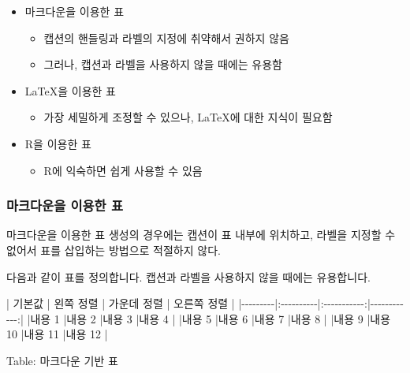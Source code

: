 \documentclass[
  letterpaper,
]{book}
\newenvironment{Shaded}{\begin{snugshade}}{\end{snugshade}}
\newcommand{\NormalTok}[1]{\textcolor[rgb]{0.00,0.23,0.31}{#1}}
\providecommand{\tightlist}{%
  \setlength{\itemsep}{0pt}\setlength{\parskip}{0pt}}\usepackage{longtable,booktabs,array}
\begin{document}
\begin{itemize}
\tightlist
\item
  마크다운을 이용한 표

  \begin{itemize}
  \tightlist
  \item
    캡션의 핸들링과 라벨의 지정에 취약해서 권하지 않음
  \item
    그러나, 캡션과 라벨을 사용하지 않을 때에는 유용함
  \end{itemize}
\item
  LaTeX을 이용한 표

  \begin{itemize}
  \tightlist
  \item
    가장 세밀하게 조정할 수 있으나, LaTeX에 대한 지식이 필요함
  \end{itemize}
\item
  R을 이용한 표

  \begin{itemize}
  \tightlist
  \item
    R에 익숙하면 쉽게 사용할 수 있음
  \end{itemize}
\end{itemize}

\hypertarget{uxb9c8uxd06cuxb2e4uxc6b4uxc744-uxc774uxc6a9uxd55c-uxd45c}{%
\subsubsection{마크다운을 이용한
표}\label{uxb9c8uxd06cuxb2e4uxc6b4uxc744-uxc774uxc6a9uxd55c-uxd45c}}

마크다운을 이용한 표 생성의 경우에는 캡션이 표 내부에
위치하고, 라벨을 지정할 수 없어서 표를 삽입하는 방법으로 적절하지 않다.

다음과 같이 표를 정의합니다. 캡션과 라벨을 사용하지 않을 때에는
유용합니다.

\begin{Shaded}
\begin{Highlighting}[]
\NormalTok{| 기본값  | 왼쪽 정렬 | 가운데 정렬 | 오른쪽 정렬 |}
\NormalTok{|{-}{-}{-}{-}{-}{-}{-}{-}{-}|:{-}{-}{-}{-}{-}{-}{-}{-}{-}{-}|:{-}{-}{-}{-}{-}{-}{-}{-}{-}{-}{-}:|{-}{-}{-}{-}{-}{-}{-}{-}{-}{-}{-}{-}:|}
\NormalTok{|내용 1   |내용 2     |내용 3       |내용 4       |}
\NormalTok{|내용 5   |내용 6     |내용 7       |내용 8       |}
\NormalTok{|내용 9   |내용 10    |내용 11      |내용 12      |}

\NormalTok{Table: 마크다운 기반 표    }
\end{Highlighting}
\end{Shaded}
\end{document}
